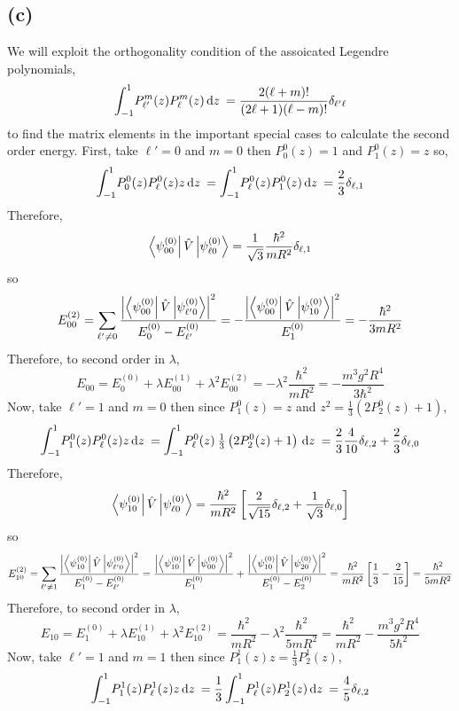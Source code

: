 \documentclass[12pt]{extarticle}
\begin{document}
\subsection*{(c)}
We will exploit the orthogonality condition of the assoicated Legendre polynomials,
\[ \int_{-1}^{1} \! P^{m}_{\ell'}(z) P^m_\ell(z) \, \mathrm{d}z \: = \frac{2 (\ell + m)!}{(2 \ell + 1)(\ell - m)!} \delta_{\ell' \ell}\]
to find the matrix elements in the important special cases to calculate the second order energy. First, take $\ell' = 0$ and $m = 0$ then $P^0_0(z) = 1$ and $P^0_1(z) = z$ so,
\[\int_{-1}^{1} \! P^{0}_{0}(z) P^0_\ell(z) z \, \mathrm{d}z \: = \int_{-1}^{1} \! P^0_\ell(z) P^0_1(z) \, \mathrm{d}z \: = \frac{2}{3} \delta_{\ell, 1}\]
Therefore,
\[\left< \psi^{(0)}_{00} \right| \hat{V} \left| \psi^{(0)}_{\ell 0} \right> = \frac{1}{\sqrt{3}}\frac{\hbar^2}{mR^2} \delta_{\ell,1}\] 
so
\[ E^{(2)}_{00} = \sum_{\ell' \neq 0} \frac{\left|\left< \psi^{(0)}_{00} \right| \hat{V} \left| \psi^{(0)}_{\ell'0} \right> \right|^2}{E^{(0)}_{0} - E^{(0)}_{\ell'}} = - \frac{\left|\left< \psi^{(0)}_{00} \right| \hat{V} \left| \psi^{(0)}_{10} \right> \right|^2}{E^{(0)}_{1}} = - \frac{\hbar^2}{3mR^2}\]
Therefore, to second order in $\lambda$,
\[E_{00} = E^{(0)}_0 + \lambda E^{(1)}_{00} + \lambda^2 E^{(2)}_{00} = - \lambda^2 \frac{\hbar^2}{mR^2} = - \frac{m^3 g^2 R^4}{3\hbar^2} \]
Now, take $\ell' = 1$ and $m = 0$ then since $P^0_1(z) = z$ and $z^2 = \tfrac{1}{3}\left(2P^0_2(z) + 1 \right)$,
\[\int_{-1}^{1} \! P^{0}_{1}(z) P^0_\ell(z) z \, \mathrm{d}z \: = \int_{-1}^{1} \! P^0_\ell(z) \: \tfrac{1}{3}\left(2P^0_2(z) + 1 \right) \, \mathrm{d}z \: = \frac{2}{3} \frac{4}{10} \delta_{\ell,2} + \frac{2}{3} \delta_{\ell,0}\]
Therefore,
\[\left< \psi^{(0)}_{10} \right| \hat{V} \left| \psi^{(0)}_{\ell 0} \right> = \frac{\hbar^2}{mR^2} \left[ \frac{2}{\sqrt{15}} \delta_{\ell,2} + \frac{1}{\sqrt{3}} \delta_{\ell,0} \right] \] 
so
\[ E^{(2)}_{10} = \sum_{\ell' \neq 1} \frac{\left|\left< \psi^{(0)}_{10} \right| \hat{V} \left| \psi^{(0)}_{\ell'0} \right> \right|^2}{E^{(0)}_{1} - E^{(0)}_{\ell'}} = \frac{\left|\left< \psi^{(0)}_{10} \right| \hat{V} \left| \psi^{(0)}_{00} \right> \right|^2}{E^{(0)}_{1}} + \frac{\left|\left< \psi^{(0)}_{10} \right| \hat{V} \left| \psi^{(0)}_{20} \right> \right|^2}{E^{(0)}_{1} - E^{(0)}_{2}} = \frac{\hbar^2}{mR^2} \left[\frac{1}{3} - \frac{2}{15} \right] = \frac{ \hbar^2}{5 m R^2} \]
Therefore, to second order in $\lambda$,
\[E_{10} = E^{(0)}_1 + \lambda E^{(1)}_{10} + \lambda^2 E^{(2)}_{10} = \frac{\hbar^2}{m R^2} - \lambda^2 \frac{\hbar^2}{5 mR^2} = \frac{\hbar^2}{m R^2} - \frac{m^3 g^2 R^4}{5 \hbar^2} \]
Now, take $\ell' = 1$ and $m = 1$ then since $P^{1}_1(z)z = \frac{1}{3} P^1_2(z)$,
\[\int_{-1}^{1} \! P^{1}_{1}(z) P^1_\ell(z) z \, \mathrm{d}z \: = \frac{1}{3} \int_{-1}^{1} \! P^1_\ell(z) P^1_2(z)  \, \mathrm{d}z \: = \frac{4}{5} \delta_{\ell,2}\]
\end{document}
